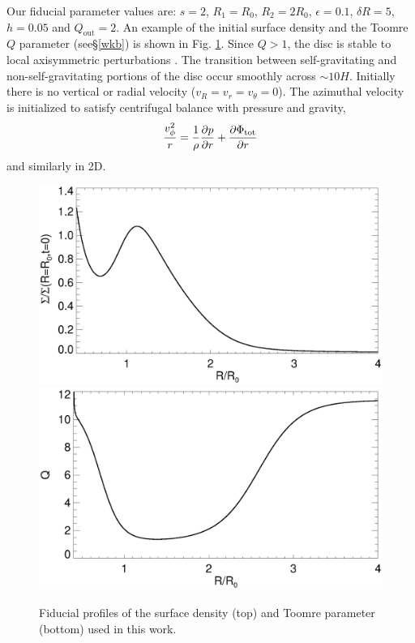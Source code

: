 Our fiducial parameter values are: $s=2$, $R_{1}=R_0$, $R_{2}=2R_0$,
$\epsilon=0.1$, $\delta R=5$, $h=0.05$ and
$Q_\mathrm{out}=2$. An example of the initial surface density and the
Toomre $Q$ parameter (see\S\ref{wkb}) is shown in
Fig. \ref{initial_surf}. Since $Q>1$, the disc is stable to local
axisymmetric perturbations \citep{toomre64}. %
The transition between self-gravitating and 
non-self-gravitating portions of the disc occur smoothly across
$\sim10H$. Initially there is no vertical or radial velocity
($v_R = v_r = v_\theta = 0$). The azimuthal velocity is initialized to
satisfy centrifugal balance with pressure and gravity,
\begin{align}
  \frac{v_\phi^2}{r} = \frac{1}{\rho}\frac{\partial p}{\partial r} + \frac{\partial
    \Phi_\mathrm{tot}}{\partial r}
\end{align}
and similarly in 2D.  

\begin{figure}
  \includegraphics[width=\linewidth,clip=true,trim=0cm 1.7cm 0cm
  0cm]{figures/compare_profiles_dens000} 
  \includegraphics[width=\linewidth]{figures/compare_profiles_Q000}
  \caption{Fiducial profiles of the surface density (top) and Toomre
    parameter (bottom) used in this work.\label{initial_surf}}
\end{figure}


